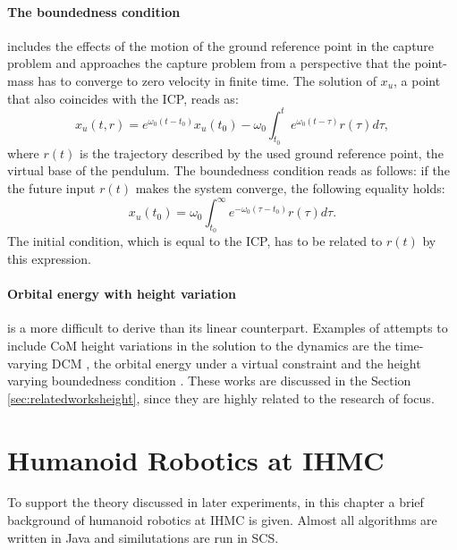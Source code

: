 \paragraph{The boundedness condition} \cite{lanari2014boundedness} includes the effects of the motion of the ground reference point in the capture problem and approaches the capture problem from a perspective that the point-mass has to converge to zero velocity in finite time. The solution of $x_u$, a point that also coincides with the \ac{ICP}, reads as:
\begin{equation}
x_u(t,r) = e^{\omega_0(t-t_0)}x_u(t_0) -\omega_0 \int_{t_0}^t e^{\omega_0(t-\tau)}r(\tau)d \tau,
\end{equation}
where $r(t)$ is the trajectory described by the used ground reference point, the virtual base of the pendulum. The boundedness condition reads as follows: if the the future input $r(t)$ makes the system converge, the following equality holds:
\begin{equation}
x_u(t_0) = \omega_0 \int_{t_0}^{\infty} e^{-\omega_0(\tau-t_0)}r(\tau)d \tau.
\end{equation}
The initial condition, which is equal to the \ac{ICP}, has to be related to $r(t)$ by this expression.

\paragraph{Orbital energy with height variation}\label{subsec:nonorbit} is a more difficult to derive than its linear counterpart.  Examples of attempts to include \ac{CoM} height variations in the solution to the dynamics are the time-varying \ac{DCM} \cite{hopkins2014humanoid}, the orbital energy under a virtual constraint \cite{pratt2007derivation} and the height varying boundedness condition \cite{caron2018balance}. These works are discussed in the Section 
\ref{sec:relatedworksheight}, since they are highly related to the research of focus.

\section{Humanoid Robotics at IHMC}
To support the theory discussed in later experiments, in this chapter a brief background of humanoid robotics at \ac{IHMC} is given. Almost all algorithms are written in Java and similutations are run in \ac{SCS}.
